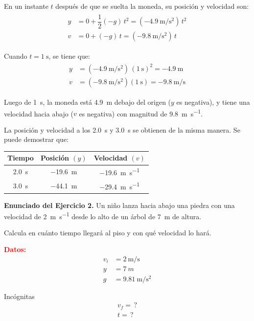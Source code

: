 \documentclass[14pt]{extarticle}
\newcommand{\textocolor}[2]{\textbf{\textcolor{#1}{#2}}}
\begin{document}
En un instante $t$ después de que se suelta la moneda, su posición y velocidad son:
\begin{eqnarray*}
\begin{aligned}
y &= 0 + \dfrac{1}{2} (-g) \, t^{2} = (\SI{-4.9}{\meter\per\square\second}) \, t^{2} \\[0.5em] 
v &= 0 + (-g) \, t = (\SI{-9.8}{\meter\per\square\second}) \, t
\end{aligned}
\end{eqnarray*}

Cuando $t = \SI{1}{\second}$, se tiene que:
\begin{eqnarray*}
\begin{aligned}
y &= (\SI{-4.9}{\meter\per\square\second}) \, (\SI{1}{\second})^{2} = \SI{-4.9}{\meter} \\[0.5em] 
v &= (\SI{-9.8}{\meter\per\square\second}) (\SI{1}{\second}) = \SI{-9.8}{\meter\per\second}
\end{aligned}
\end{eqnarray*}

Luego de \SI{1}{\second}, la moneda está \SI{4.9}{\meter} debajo del origen ($y$ es negativa),  y tiene una velocidad hacia abajo ($v$ es negativa) con magnitud de \SI{9.8}{\meter\per\second}.

La posición y velocidad a los \SI{2.0}{\second} y \SI{3.0}{\second} se obtienen de la misma manera. Se puede demostrar que:
\begin{table}[H]
\centering
\begin{tabular}{c | c | c}
Tiempo & Posición $(y)$ & Velocidad $(v)$ \\ \hline
\SI{2.0}{\second} & \SI{-19.6}{\meter} & \SI{-19.6}{\meter\per\second} \\ \hline
\SI{3.0}{\second} & \SI{-44.1}{\meter} & \SI{-29.4}{\meter\per\second} \\ \hline
\end{tabular}
\end{table}

\noindent
\textbf{Enunciado del Ejercicio 2. } Un niño lanza hacia abajo una piedra con una velocidad de \SI{2}{\meter\per\second} desde lo alto de un árbol de \SI{7}{\meter} de altura. 

Calcula en cuánto tiempo llegará al piso y con qué velocidad lo hará.

\begin{minipage}[t]{0.4\linewidth}
\textocolor{red}{Datos:}
\begin{align*}
v_{i} &= \SI{2}{\meter\per\second} \\[0.5em]
y &= \SI{7}{m} \\[0.5em]
g &= \SI{9.81}{\meter\per\square\second}
\end{align*}
\end{minipage}
\hspace{0.2cm}
\begin{minipage}[t]{0.4\linewidth}
Incógnitas
\begin{align*}
v_{f} = \, ? \\[0.5em]
t = \, ?
\end{align*}
\end{minipage}
\end{document}

